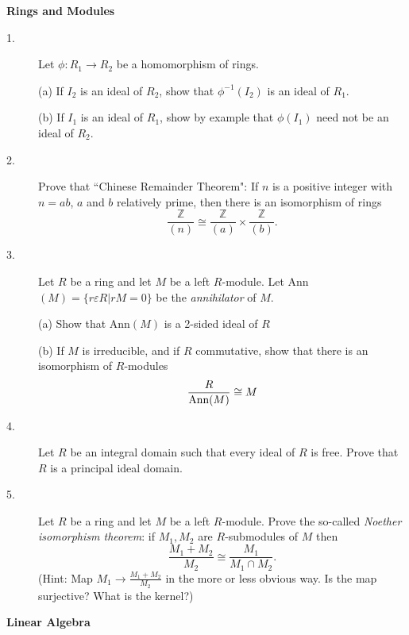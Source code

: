 \documentclass{article}
\def\Z{\mathbb Z}
\begin{document}
{\bf Rings and Modules}

\begin{description}
\item[1.]
Let $\phi : R_1 \to R_2$ be a homomorphism of rings.

\item[\quad] (a)
If $I_2$ is an ideal of $R_2$, show that $\phi^{-1} (I_2)$ is an ideal of
$R_1$.

\item[\quad] (b)
If $I_1$ is an ideal of $R_1$, show by example that $\phi(I_1)$ need not be
an ideal of $R_2$.

\item[2.]
Prove that ``Chinese  Remainder Theorem": If $n$ is a positive integer with
$n=ab$, $a$ and $b$ relatively prime, then there is an isomorphism of rings
$$\frac{\Z}{(n)} \cong \frac{\Z}{(a)} \times \frac{\Z}{(b)}.$$

\item[3.]
Let $R$ be a ring and let $M$ be a left $R$-module. Let
Ann$(M) = \{r \varepsilon R |rM = 0\}$ be the {\it annihilator} of $M$.

\item[\quad] (a)
Show that Ann$(M)$ is a 2-sided ideal of $R$

\item[\quad] (b)
If $M$ is irreducible, and if $R$ commutative, show that there is an
isomorphism of $R$-modules
$$\frac{R}{\hbox{Ann} (M)} \cong M$$

\item[4.]
Let $R$ be an integral domain such that every ideal of $R$ is free. Prove
that $R$ is a principal ideal domain.

\item[5.]
Let $R$ be a ring and let $M$ be a left $R$-module. Prove the so-called
{\it Noether isomorphism theorem}: if $M_1, M_2$ are $R$-submodules of
$M$ then
$$\frac{M_1 + M_2}{M_2} \cong \frac{M_1}{M_1 \cap M_2} .$$
(Hint: Map $M_1 \to \frac{M_1 + M_2}{M_2}$ in the more or less obvious
way. Is the map surjective? What is the kernel?)

\end{description}

{\bf Linear Algebra}
\end{document}
